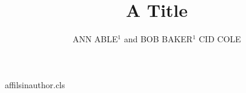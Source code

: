 \begin{filecontents*}[overwrite]{affilsinauthor.cls}
\def\affilfont{\small}
\def\author#1{\gdef\@author{#1}}
\def\affil#1{\gdef\@affil{#1}\ifx\@affil\@empty\else{\reset@font\affilfont\unskip,\ #1\vphantom{gy}\endgraf}\fi}\affil{}
\def\maketitle{\par{\Large\@title\par}{\noindent\@author\par}}
\end{filecontents*}
\documentclass{affilsinauthor}

\title{A Title}
\author{ANN ABLE$^1$ and BOB BAKER$^1$   CID COLE }
\maketitle
Body.


